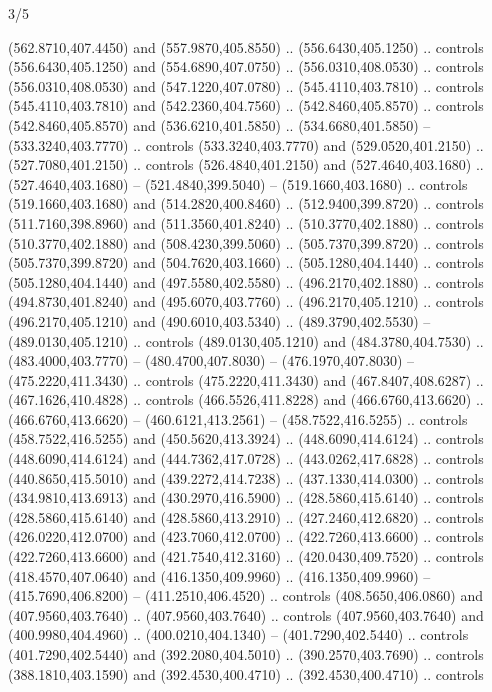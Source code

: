 \begin{flagdescription}{3/5}
\begin{scope}[shift={(0.5\flaglength,0.5\flagwidth)},scale=\flagwidth/510]
\begin{scope}[y=0.80pt, x=0.80pt, yscale=-1.06, xscale=1.06,yshift=-240pt,xshift=-400pt]
\begin{scope}[cm={{0.83333,0.0,0.0,0.83333,(154.64672,48.64761)}}]
\begin{scope}[cm={{0.93334,0.0,0.0,0.93334,(-4.86471,22.64035)}}]
\begin{scope}[line width=0.489\lw]
  (562.8710,407.4450) and (557.9870,405.8550) .. (556.6430,405.1250) .. controls
  (556.6430,405.1250) and (554.6890,407.0750) .. (556.0310,408.0530) .. controls
  (556.0310,408.0530) and (547.1220,407.0780) .. (545.4110,403.7810) .. controls
  (545.4110,403.7810) and (542.2360,404.7560) .. (542.8460,405.8570) .. controls
  (542.8460,405.8570) and (536.6210,401.5850) .. (534.6680,401.5850) --
  (533.3240,403.7770) .. controls (533.3240,403.7770) and (529.0520,401.2150) ..
  (527.7080,401.2150) .. controls (526.4840,401.2150) and (527.4640,403.1680) ..
  (527.4640,403.1680) -- (521.4840,399.5040) -- (519.1660,403.1680) .. controls
  (519.1660,403.1680) and (514.2820,400.8460) .. (512.9400,399.8720) .. controls
  (511.7160,398.8960) and (511.3560,401.8240) .. (510.3770,402.1880) .. controls
  (510.3770,402.1880) and (508.4230,399.5060) .. (505.7370,399.8720) .. controls
  (505.7370,399.8720) and (504.7620,403.1660) .. (505.1280,404.1440) .. controls
  (505.1280,404.1440) and (497.5580,402.5580) .. (496.2170,402.1880) .. controls
  (494.8730,401.8240) and (495.6070,403.7760) .. (496.2170,405.1210) .. controls
  (496.2170,405.1210) and (490.6010,403.5340) .. (489.3790,402.5530) --
  (489.0130,405.1210) .. controls (489.0130,405.1210) and (484.3780,404.7530) ..
  (483.4000,403.7770) -- (480.4700,407.8030) -- (476.1970,407.8030) --
  (475.2220,411.3430) .. controls (475.2220,411.3430) and (467.8407,408.6287) ..
  (467.1626,410.4828) .. controls (466.5526,411.8228) and (466.6760,413.6620) ..
  (466.6760,413.6620) -- (460.6121,413.2561) -- (458.7522,416.5255) .. controls
  (458.7522,416.5255) and (450.5620,413.3924) .. (448.6090,414.6124) .. controls
  (448.6090,414.6124) and (444.7362,417.0728) .. (443.0262,417.6828) .. controls
  (440.8650,415.5010) and (439.2272,414.7238) .. (437.1330,414.0300) .. controls
  (434.9810,413.6913) and (430.2970,416.5900) .. (428.5860,415.6140) .. controls
  (428.5860,415.6140) and (428.5860,413.2910) .. (427.2460,412.6820) .. controls
  (426.0220,412.0700) and (423.7060,412.0700) .. (422.7260,413.6600) .. controls
  (422.7260,413.6600) and (421.7540,412.3160) .. (420.0430,409.7520) .. controls
  (418.4570,407.0640) and (416.1350,409.9960) .. (416.1350,409.9960) --
  (415.7690,406.8200) -- (411.2510,406.4520) .. controls (408.5650,406.0860) and
  (407.9560,403.7640) .. (407.9560,403.7640) .. controls (407.9560,403.7640) and
  (400.9980,404.4960) .. (400.0210,404.1340) -- (401.7290,402.5440) .. controls
  (401.7290,402.5440) and (392.2080,404.5010) .. (390.2570,403.7690) .. controls
  (388.1810,403.1590) and (392.4530,400.4710) .. (392.4530,400.4710) .. controls

\end{scope}
\end{scope}
\end{scope}
\end{scope}
\end{scope}
\end{flagdescription}
